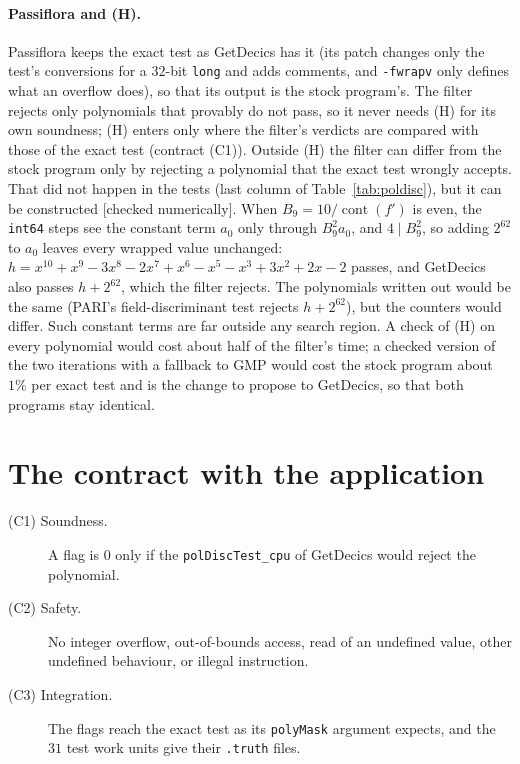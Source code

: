 \documentclass[10pt,a4paper]{article}
\DeclareMathOperator{\cont}{cont}
\newcommand{\code}[1]{\texttt{#1}}
\newcommand{\stnum}{\textsf{\small[checked numerically]}\xspace}
\theoremstyle{plain}
\theoremstyle{definition}
\begin{document}
\paragraph{Passiflora and (H).}  Passiflora keeps the exact test as GetDecics has it (its patch changes only the test's conversions for a $32$-bit \code{long} and adds
comments, and \code{-fwrapv} only defines what an overflow does), so that its output is the stock program's.  The filter rejects only polynomials that provably do not pass, so it never needs (H) for its own soundness;
(H) enters only where the filter's verdicts are compared with those of the exact test (contract (C1)).  Outside (H) the filter can differ from the stock program only
by rejecting a polynomial that the exact test wrongly accepts.  That did not happen in the tests (last column of Table~\ref{tab:poldisc}), but it can be constructed
\stnum.  When $B_9=10/\cont(f')$ is even, the \code{int64} steps see the constant term $a_0$ only through $B_9^2a_0$, and $4\mid B_9^2$, so adding $2^{62}$ to $a_0$
leaves every wrapped value unchanged: $h=x^{10}+x^9-3x^8-2x^7+x^6-x^5-x^3+3x^2+2x-2$ passes, and GetDecics also passes $h+2^{62}$, which the filter rejects.  The
polynomials written out would be the same (PARI's field-discriminant test rejects $h+2^{62}$), but the counters would differ.  Such constant terms are far outside any
search region.  A check of (H) on every polynomial would cost about half of the filter's time; a checked version of the two iterations with a fallback to GMP would
cost the stock program about $1\%$ per exact test and is the change to propose to GetDecics, so that both programs stay identical.

\section{The contract with the application}\label{sec:contract}

\begin{description}
\item[(C1) Soundness.] A flag is $0$ only if the \code{polDiscTest\_cpu} of GetDecics would reject the polynomial.
\item[(C2) Safety.] No integer overflow, out-of-bounds access, read of an undefined value, other undefined behaviour, or illegal instruction.
\item[(C3) Integration.] The flags reach the exact test as its \code{polyMask} argument expects, and the $31$ test work units give their \code{.truth} files.
\end{description}
\end{document}
